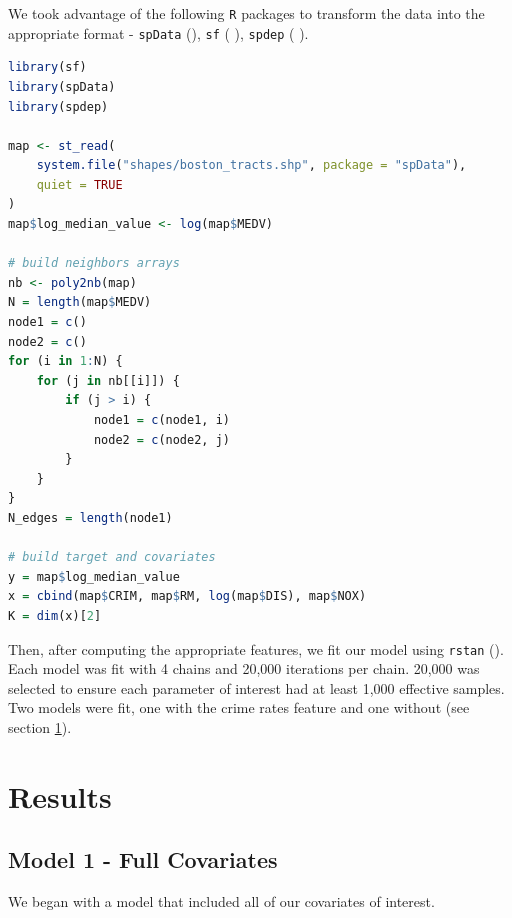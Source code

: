 \documentclass[11pt]{article}
\newcommand{\code}[1]{\colorbox{light-gray}{\texttt{#1}}}
\begin{document}
We took advantage of the following \code{R} packages to transform the data into the appropriate format - \code{spData} (\cite{spdata}), \code{sf} (\cite{sf1} \cite{sf2}), \code{spdep} (\cite{spdep1} \cite{spdep2} \cite{spdep3} \cite{spdep4}).

\begin{lstlisting}[language=R, basicstyle=\small]
library(sf)
library(spData)
library(spdep)

map <- st_read(
    system.file("shapes/boston_tracts.shp", package = "spData"), 
    quiet = TRUE
)
map$log_median_value <- log(map$MEDV)

# build neighbors arrays
nb <- poly2nb(map)
N = length(map$MEDV)
node1 = c()
node2 = c()
for (i in 1:N) {
    for (j in nb[[i]]) {
        if (j > i) {
            node1 = c(node1, i)
            node2 = c(node2, j)
        }
    }
}
N_edges = length(node1)

# build target and covariates
y = map$log_median_value
x = cbind(map$CRIM, map$RM, log(map$DIS), map$NOX)
K = dim(x)[2]
\end{lstlisting}

Then, after computing the appropriate features, we fit our model using \code{rstan} (\cite{rstan}). Each model was fit with 4 chains and 20,000 iterations per chain. 20,000 was selected to ensure each parameter of interest had at least 1,000 effective samples. Two models were fit, one with the crime rates feature and one without (see section \ref{results}). 





\section{Results} \label{results}

\subsection{Model 1 - Full Covariates} \label{model1}

We began with a model that included all of our covariates of interest. 
\end{document}
